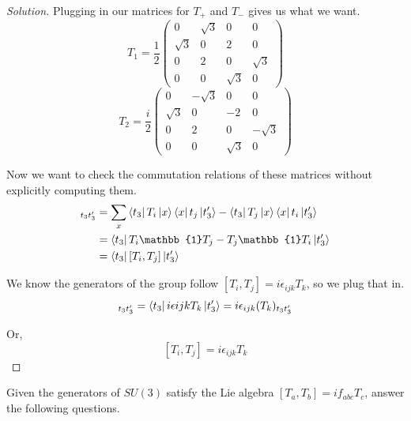\documentclass[12pt]{article}
\newenvironment{question}[2][Question]{\begin{trivlist}
\item[\hskip \labelsep {\bfseries #1}\hskip \labelsep {\bfseries #2.}]}{\end{trivlist}}
\newenvironment{solution}{\begin{proof}[Solution]}{\end{proof}}
\begin{document}
\begin{solution}
Plugging in our matrices for $T_+$ and $T_-$ gives us what we want.
\begin{equation*}
    \boxed{T_1=\frac{1}{2}\begin{pmatrix}
        0 & \sqrt{3} & 0 & 0 \\
        \sqrt{3} & 0 & 2 & 0 \\
        0 & 2 & 0 & \sqrt{3} \\
        0 & 0 & \sqrt{3} & 0
    \end{pmatrix}}
\end{equation*}
\begin{equation*}
    \boxed{T_2=\frac{i}{2}\begin{pmatrix}
        0 & -\sqrt{3} & 0 & 0 \\
        \sqrt{3} & 0 & -2 & 0 \\
        0 & 2 & 0 & -\sqrt{3} \\
        0 & 0 & \sqrt{3} & 0
    \end{pmatrix}}
\end{equation*}

Now we want to check the commutation relations of these matrices without explicitly computing them.
\begin{align*}
    [T_i,T_j]_{t_3t_3'}&=\sum_x\bra{t_3}T_i\ket{x}\bra{x}t_j\ket{t_3'}-\bra{t_3}T_j\ket{x}\bra{x}t_i\ket{t_3'} \\
    &= \bra{t_3}T_i \mathbb{1} T_j - T_j \mathbb{1} T_i \ket{t_3'} \\
    &= \bra{t_3}[T_i,T_j]\ket{t_3'}
\end{align*}

We know the generators of the group follow $[T_i,T_j]=i\epsilon_{ijk} T_k$, so we plug that in.
\begin{align*}
    [T_i,T_j]_{t_3t_3'}=\bra{t_3}i\epsilon{ijk}T_k\ket{t_3'}=i\epsilon_{ijk}(T_k)_{t_3t_3'}
\end{align*}

Or,
\begin{equation*}
    \boxed{[T_i,T_j]=i\epsilon_{ijk}T_k}
\end{equation*}

\end{solution}

\newpage

\begin{question}{23.1}
Given the generators of $SU(3)$ satisfy the Lie algebra $[T_a,T_b]=if_{abc}T_c$, answer the following questions.
\end{question}
\end{document}
